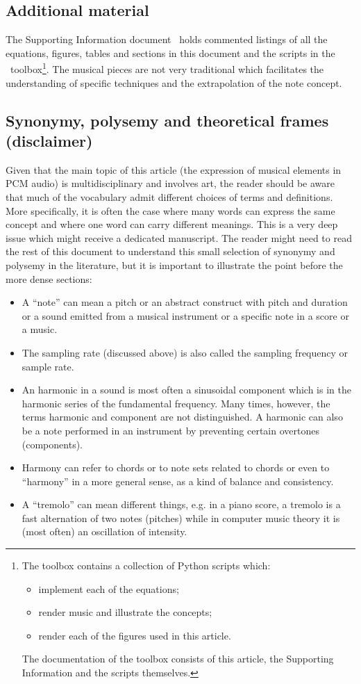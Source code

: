 \subsection{Additional material}
The Supporting Information document~\cite{SI} holds commented listings of all the equations, figures, tables and sections in this document
and the scripts in the \massa\ toolbox\footnote{The toolbox contains a collection of Python scripts which:
\begin{itemize}
    \item implement each of the equations;
    \item render music and illustrate the concepts;
    \item render each of the figures used in this article.
\end{itemize}
The documentation of the toolbox consists of this article, the Supporting Information and the scripts themselves.}.
The musical pieces are not very traditional which facilitates the understanding of specific techniques
and the extrapolation of the note concept.

\subsection{Synonymy, polysemy and theoretical frames (disclaimer)}
Given that the main topic of this article (the expression of musical elements
in PCM audio) is multidisciplinary and involves art,
the reader should be aware that much of the vocabulary admit different choices of terms and definitions.
More specifically, it is often the case where many words can express the same concept
and where one word can carry different meanings.
This is a very deep issue which might receive a dedicated manuscript.
The reader might need to read the rest of this document to understand this
small selection of synonymy and polysemy in the literature,
but it is important to illustrate the point before the more dense sections:
\begin{itemize}
	\item A ``note'' can mean a pitch or an abstract construct with pitch and duration or a sound emitted from a musical instrument or a specific note in a score or a music.
	\item The sampling rate (discussed above) is also called the sampling frequency or sample rate.
	\item An harmonic in a sound is most often a sinusoidal component which is in the harmonic series of the fundamental frequency. Many times, however, the terms harmonic and component are not distinguished. A harmonic can also be a note performed in an instrument by preventing certain overtones (components).
	\item Harmony can refer to chords or to note sets related to chords or even to ``harmony'' in a more general sense, as a kind of balance and consistency.
	\item A ``tremolo'' can mean different things, e.g. in a piano score, a tremolo is a fast alternation of two notes (pitches) while in computer music theory it is (most often) an oscillation of intensity.
\end{itemize}

